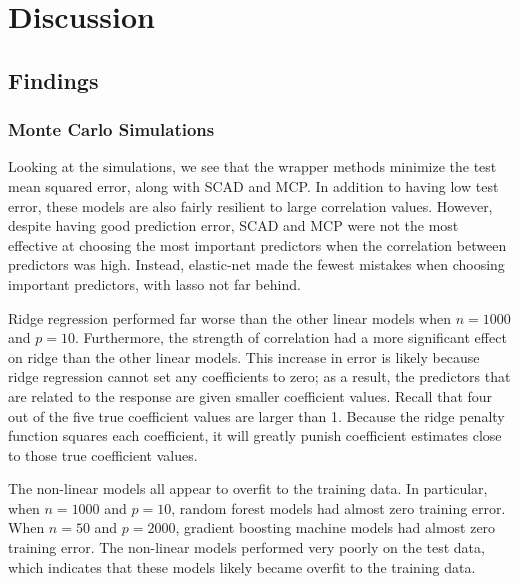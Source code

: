 \documentclass{article}
\begin{document}
\section{Discussion}


\subsection{Findings}
\subsubsection{Monte Carlo Simulations}
Looking at the simulations, we see that the wrapper methods minimize the test mean squared error, along with SCAD and MCP. In addition to having low test error, these models are also fairly resilient to large correlation values. However, despite having good prediction error, SCAD and MCP were not the most effective at choosing the most important predictors when the correlation between predictors was high. Instead, elastic-net made the fewest mistakes when choosing important predictors, with lasso not far behind.

Ridge regression performed far worse than the other linear models when $n=1000$ and $p=10$. Furthermore, the strength of correlation had a more significant effect on ridge than the other linear models. This increase in error is likely because ridge regression cannot set any coefficients to zero; as a result, the predictors that are related to the response are given smaller coefficient values. Recall that four out of the five true coefficient values are larger than 1. Because the ridge penalty function squares each coefficient, it will greatly punish coefficient estimates close to those true coefficient values.

The non-linear models all appear to overfit to the training data. In particular, when $n = 1000$ and $p = 10$, random forest models had almost zero training error. When $n = 50$ and $p = 2000$, gradient boosting machine models had almost zero training error. The non-linear models performed very poorly on the test data, which indicates that these models likely became overfit to the training data.
\end{document}
